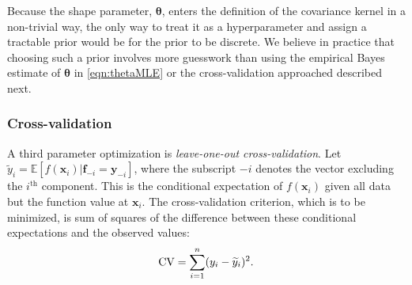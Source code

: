 \documentclass[twocolumn]{svjour3}          %
\newcommand{\bm}[1]{\boldsymbol{#1}}
\newcommand{\Ex}{\mathbb{E}}
\newcommand{\vtheta}{{\bm{\theta}}}
\newcommand{\vf}{\bm{f}}
\newcommand{\vx}{\bm{x}}
\newcommand{\vy}{\bm{y}}
\begin{document}
Because the shape parameter, $\vtheta$, enters the definition of the covariance kernel in a non-trivial way, the only way to treat it as a hyperparameter and assign a tractable prior would be for the prior to be discrete.  We believe in practice that choosing such a prior involves more guesswork than using the empirical Bayes estimate of $\vtheta$ in \eqref{eqn:thetaMLE} or the cross-validation approached described next.


\subsubsection{Cross-validation} 
A third parameter optimization is \emph{leave-one-out cross-validation}.  Let $\widetilde{y}_i = \Ex[f(\vx_i ) | \vf_{-i} = \vy_{-i}]$, where the subscript $-i$ denotes the vector excluding the $i^{\text{th}}$ component.  This is the conditional expectation of $f(\vx_i )$ given all data but the function value at $\vx_i$.  The cross-validation criterion, which is to be minimized, is sum of squares of the difference between these conditional expectations and the observed values:
\begin{equation} \label{FJH:eq:CVA}
\textup{CV} = \sum_{i=1}^n (y_i - \widetilde{y}_i)^2.
\end{equation}
\end{document}
